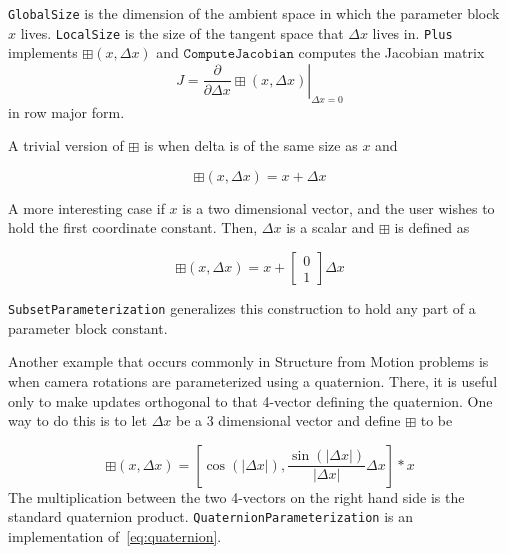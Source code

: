 \texttt{GlobalSize} is the dimension of the ambient space in which the parameter block $x$ lives. \texttt{LocalSize} is the size of the tangent space that $\Delta x$ lives in. \texttt{Plus} implements $\boxplus(x,\Delta x)$ and $\texttt{ComputeJacobian}$ computes the Jacobian matrix 
\begin{equation}
	J = \left . \frac{\partial }{\partial \Delta x} \boxplus(x,\Delta x)\right|_{\Delta x = 0}
\end{equation}
in row major form.

A trivial version of $\boxplus$ is when delta is of the same size as $x$
and

\begin{equation}
  \boxplus(x, \Delta x) = x + \Delta x
\end{equation}

A more interesting case if $x$ is a two dimensional vector, and the
user wishes to hold the first coordinate constant. Then, $\Delta x$ is a
scalar and $\boxplus$ is defined as

\begin{equation}
  \boxplus(x, \Delta x) = x + \left[ \begin{array}{c} 0 \\ 1
                                  \end{array} \right]        \Delta x
\end{equation}

\texttt{SubsetParameterization} generalizes this construction to hold any part of a parameter block constant.


Another example that occurs commonly in Structure from Motion problems
is when camera rotations are parameterized using a quaternion. There,
it is useful only to make updates orthogonal to that 4-vector defining
the quaternion. One way to do this is to let $\Delta x$ be a 3
dimensional vector and define $\boxplus$ to be

\begin{equation}
  \boxplus(x, \Delta x) = 
\left[
\cos(|\Delta x|), \frac{\sin\left(|\Delta x|\right)}{|\Delta x|} \Delta x 
\right] * x
\label{eq:quaternion}
\end{equation}
The multiplication between the two 4-vectors on the right hand
side is the standard quaternion product. \texttt{QuaternionParameterization} is an implementation of~\eqref{eq:quaternion}.

